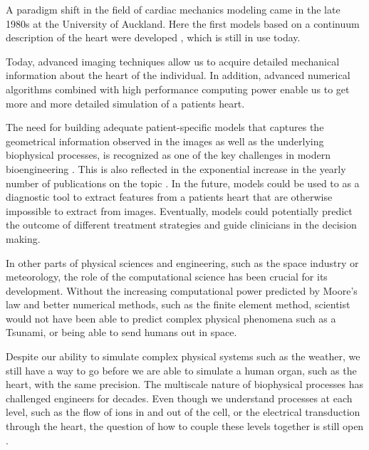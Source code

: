 A paradigm shift in the field of cardiac mechanics modeling came in
the late 1980s at the University of Auckland. Here the first models
based on a continuum description of the heart were developed
\cite{hunter1988analysis}, which is still in use today. 





Today, advanced imaging techniques allow us to acquire detailed
mechanical information about the heart of the individual. In addition,
advanced numerical algorithms combined with high performance computing
power enable us to get more and more detailed simulation of a patients
heart. 



The need for building adequate patient-specific models that captures
the geometrical information observed in the images as well as the
underlying biophysical processes, is recognized as one of the key
challenges in modern bioengineering \cite{hunter2010vision}. This is
also reflected in the exponential increase in the yearly number of
publications on the topic \cite{sack2016personalised}.
In the future, models could be used to as a diagnostic tool to extract
features from a patients heart that are otherwise impossible to extract from
images. Eventually, models could potentially predict the outcome of
different treatment strategies and guide clinicians in the decision making.

In other parts of physical sciences and engineering, such as the
space industry or meteorology, the role of the computational
science has been crucial for its development. Without the increasing
computational power predicted by Moore's law
\cite{brock2006understanding} and better numerical methods, such as the
finite element method, scientist would not have been able to predict
complex physical phenomena such as a Tsunami, or being able to send
humans out in space. 

Despite our ability to simulate complex physical systems such as
the weather, we still have a way to go before we are able to
simulate a human organ, such as the heart, with the same precision. The
multiscale nature of biophysical processes has challenged engineers for decades.
Even though we understand processes at each level, such as the flow of
ions in and out of the cell, or the electrical transduction through the
heart, the question of how to couple these levels together is still open
\cite{noble2002modeling}.


